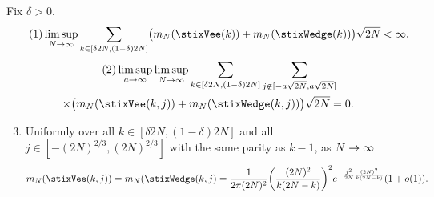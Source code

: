 \documentclass[AHL,Unicode,longabstracts]{cedram}
\newcommand{\Wedge}{\stixWedge}
\newcommand{\Vee}{\stixVee}
\theoremstyle{plain}
\let\originalleft\left
\let\originalright\right
\renewcommand{\left}{\mathopen{}\mathclose\bgroup\originalleft}
\renewcommand{\right}{\aftergroup\egroup\originalright}
\renewcommand*{\to}{\mathchoice{\longrightarrow}{\rightarrow}{\rightarrow}{\rightarrow}}
\begin{document}
\begin{lemm}\label{lemma:EstimatesmN}
Fix $\delta > 0$.
\begin{equation}\label{lemm4.6.1}
\tag{$1$}
\limsup_{N\to\infty} \sum_{k\in [\delta 2N, (1 - \delta) 2N]} \bigl(m_N(\Vee(k)) + m_N(\Wedge(k))\bigr) \sqrt{2N} < \infty.
\end{equation}
\begin{multline}\label{lemm4.6.2}
\tag{$2$}
\limsup_{a\to\infty}\limsup_{N\to\infty} \sum_{k\in [\delta 2N, (1 - \delta) 2N]} \sum_{j\notin [-a\sqrt{2N}, a\sqrt{2N}]}\\
\times\bigl(m_N(\Vee(k,j)) + m_N(\Wedge(k,j))\bigr)\sqrt{2N} = 0.
\end{multline}
\begin{enumerate}
\setcounter{enumi}{2}
\item\label{lemm4.6.3} Uniformly over all $k\in [\delta 2N, (1 - \delta) 2N]$ and all $j \in [-(2N)^{2/3},(2N)^{2/3}]$ with the same parity as $k-1$, as $N\to\infty$
\begin{align*}
m_{N}(\Vee(k,j)) = m_{N}(\Wedge(k,j) = \frac1{2\pi (2N)^2} \left(\frac{(2N)^2}{k (2N-k)}\right)^{2} e^{-\frac{j^2}{2N} \frac{(2N)^2}{k(2N-k)}} (1+o(1)).
\end{align*}
\end{enumerate}
\end{lemm}
\end{document}
